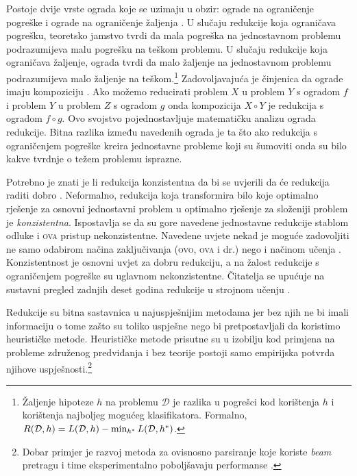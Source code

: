Postoje dvije vrste ograda koje se uzimaju u obzir: ograde na ograničenje
pogreške  i ograde na ograničenje žaljenja . U slučaju redukcije koja ograničava pogrešku, teoretsko jamstvo tvrdi
da mala pogreška na jednostavnom problemu podrazumijeva malu pogrešku na teškom
problemu. U slučaju redukcije koja ograničava žaljenje, ograda tvrdi da malo
žaljenje na jednostavnom problemu podrazumijeva malo žaljenje na
teškom.\footnote{Žaljenje hipoteze $h$ na problemu $\mathcal{D}$ je razlika u
pogrešci kod korištenja $h$ i korištenja najboljeg mogućeg klasifikatora.
Formalno, $R(\mathcal{D}, h) = L(\mathcal{D}, h) - \min_{h\ssymbol{1}}
L(\mathcal{D}, h\ssymbol{1})$.} Zadovoljavajuća je činjenica da ograde imaju
kompoziciju \citep{beygelzimer2005error}. Ako možemo reducirati problem $X$ u
problem $Y$ s ogradom $f$ i problem $Y$ u problem $Z$ s ogradom $g$ onda
kompozicija $X \circ Y$ je redukcija s ogradom $f \circ g$. Ovo svojstvo
pojednostavljuje matematičku analizu ograda redukcije. Bitna razlika između
navedenih ograda je ta što ako redukcija s ograničenjem pogreške kreira
jednostavne probleme koji su šumoviti onda su bilo kakve tvrdnje o težem
problemu isprazne.

Potrebno je znati je li redukcija konzistentna  da bi se
uvjerili da će redukcija raditi dobro \citep{beygelzimer2009error,
daume15reductions}. Neformalno, redukcija koja transformira bilo koje optimalno
rješenje za osnovni jednostavni problem u optimalno rješenje za složeniji
problem je \textit{konzistentna}. Ispostavlja se da su gore navedene jednostavne
redukcije stablom odluke i \textsc{ova} pristup nekonzistentne. Navedene uvjete
nekad je moguće zadovoljiti ne samo odabirom načina zaključivanja (\textsc{ovo},
\textsc{ova} i dr.) nego i načinom učenja \citep{abe2004iterative,
beygelzimer2005weighted}. Konzistentnost je osnovni uvjet za dobru redukciju, a
na žalost redukcije s ograničenjem pogreške su uglavnom nekonzistentne.
Čitatelja se upućuje na sustavni pregled zadnjih deset godina redukcije u
strojnom učenju \citep{daume15reductions}.

Redukcije su bitna sastavnica u najuspješnijim \lts{} metodama jer bez njih ne
bi imali informaciju o tome zašto su toliko uspješne nego bi pretpostavljali da
koristimo heurističke metode. Heurističke metode prisutne su u izobilju kod
primjena na probleme združenog predviđanja i bez teorije postoji samo empirijska
potvrda njihove uspješnosti.\footnote{Dobar primjer je razvoj metoda za
ovisnosno parsiranje koje koriste \textit{beam} pretragu i time eksperimentalno
poboljšavaju performanse \citep{zhang2011transition, bohnet2012transition}.}
